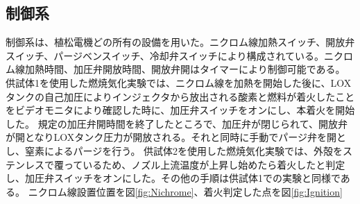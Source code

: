 \subsection{制御系}
制御系は、植松電機どの所有の設備を用いた。ニクロム線加熱スイッチ、開放弁スイッチ、パージベンスイッチ、冷却弁スイッチにより構成されている。ニクロム線加熱時間、加圧弁開放時間、開放弁開はタイマーにより制御可能である。
\\
供試体1を使用した燃焼気化実験では、ニクロム線を加熱を開始した後に、LOXタンクの自己加圧によりインジェクタから放出される酸素と燃料が着火したことをビデオモニタにより確認した時に、加圧弁スイッチをオンにし、本着火を開始した。
規定の加圧弁開時間を終了したところで、加圧弁が閉じられて、開放弁が開となりLOXタンク圧力が開放される。それと同時に手動でパージ弁を開とし、窒素によるパージを行う。
供試体2を使用した燃焼気化実験では、外殻をステンレスで覆っているため、ノズル上流温度が上昇し始めたら着火したと判定し、加圧弁スイッチをオンにした。その他の手順は供試体1での実験と同様である。
ニクロム線設置位置を図\ref{fig:Nichrome}、着火判定した点を図\ref{fig:Ignition}
